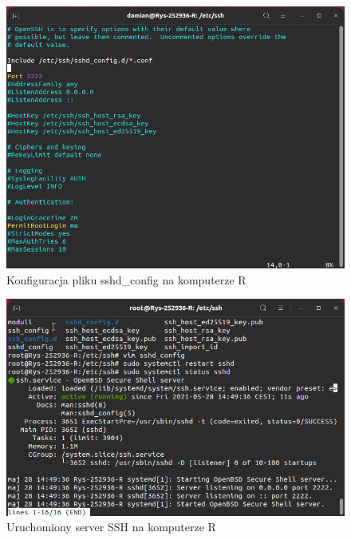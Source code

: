 \documentclass{article}
\begin{document}
\begin{figure}[H]
    \centering
    \includegraphics[scale = 0.45]{7.SSH/TWO3cUq.png}  
    \caption{Konfiguracja pliku sshd\_config na komputerze R}
    \label{2}
\end{figure}

\newpage
\begin{figure}[H]
    \centering
    \includegraphics[scale = 0.65]{7.SSH/VirtualBoxVM_6noF4O3CM7.png}  
    \caption{Uruchomiony server SSH na komputerze R}
    \label{2}
\end{figure}
\end{document}
